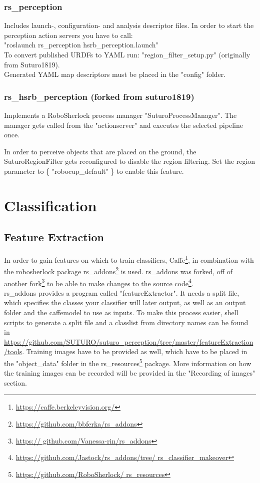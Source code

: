 \documentclass[main.tex]{subfiles}
\begin{document}
			\subsubsection{rs\_perception}
			Includes launch-, configuration- and analysis descriptor files.
			In order to start the perception action servers you have to call:\\
			"roslaunch rs\_perception hsrb\_perception.launch"\\
			To convert published URDFs to YAML run: "region\_filter\_setup.py" (originally from Suturo1819).\\
			Generated YAML map descriptors must be placed in the "config" folder.

			\subsubsection{rs\_hsrb\_perception (forked from suturo1819)}
			Implements a RoboSherlock process manager "SuturoProcessManager".
			The manager gets called from the "actionserver" and executes the selected pipeline once.
			
			In order to perceive objects that are placed on the ground, the SuturoRegionFilter gets reconfigured
			to disable the region filtering. Set the region parameter to \{ "robocup\_default" \} to enable this feature.

		\section{Classification}
		    \subsection{Feature Extraction}
		    In order to gain features on which to train classifiers, Caffe\footnote{\url{https://caffe.berkeleyvision.org/}}, in combination with the robosherlock 				package rs\_addons\footnote{\url{https://github.com/bbferka/rs_addons}} is used. rs\_addons was forked, off of another fork\footnote{\url{https://					github.com/Vanessa-rin/rs_addons}} to be able to make changes to the source code\footnote{\url{https://github.com/Jastock/rs_addons/tree/								rs_classifier_makeover}}.\\
		    
		    rs\_addons provides a program called "featureExtractor". It needs a split file, which specifies the classes your classifier will later output, as well 				as an output folder and the caffemodel to use as inputs. To make this process easier, shell scripts to generate a split file and a classlist from 					directory names can be found in \url{https://github.com/SUTURO/suturo_perception/tree/master/featureExtraction/tools}. Training images have to be 					provided as well, which have to be placed in the "object\_data" folder in the rs\_resources\footnote{\url{https://github.com/RoboSherlock/							rs_resources}} package. More information on how the training images can be recorded will be provided in the "Recording of images" section.\\
		    
\end{document}
